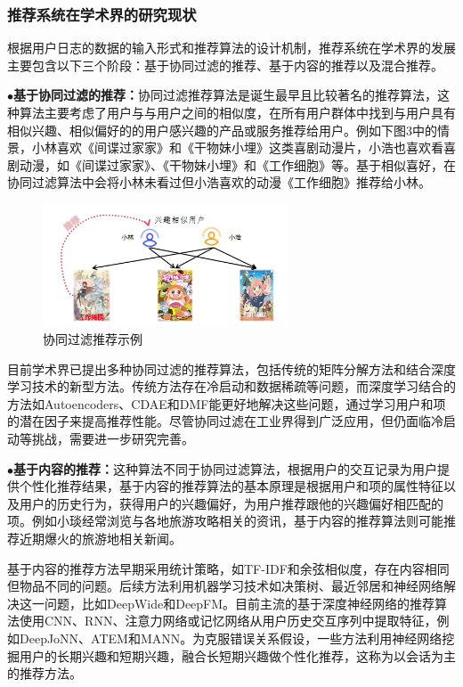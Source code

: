 \documentclass[withoutpreface,bwprint]{cumcmthesis} %
\begin{document}
	\subsubsection{ 推荐系统在学术界的研究现状}
	根据用户日志的数据的输入形式和推荐算法的设计机制，推荐系统在学术界的发展主要包含以下三个阶段：基于协同过滤的推荐、基于内容的推荐以及混合推荐。\par
	$\bullet$\textbf{基于协同过滤的推荐：}协同过滤推荐算法是诞生最早且比较著名的推荐算法，这种算法主要考虑了用户与与用户之间的相似度，在所有用户群体中找到与用户具有相似兴趣、相似偏好的的用户感兴趣的产品或服务推荐给用户。例如下图3中的情景，小林喜欢《间谍过家家》和《干物妹小埋》这类喜剧动漫片，小浩也喜欢看喜剧动漫，如《间谍过家家》、《干物妹小埋》和《工作细胞》等。基于相似喜好，在协同过滤算法中会将小林未看过但小浩喜欢的动漫《工作细胞》推荐给小林。\par
	\begin{figure}[H]
		\centering
		\includegraphics[width=0.65\textwidth]{3}
		\caption{协同过滤推荐示例}
		\label{fig:circuit-diagcam}
	\end{figure}
	目前学术界已提出多种协同过滤的推荐算法，包括传统的矩阵分解方法和结合深度学习技术的新型方法。传统方法存在冷启动和数据稀疏等问题，而深度学习结合的方法如Autoencoders、CDAE和DMF能更好地解决这些问题，通过学习用户和项的潜在因子来提高推荐性能。尽管协同过滤在工业界得到广泛应用，但仍面临冷启动等挑战，需要进一步研究完善。\par
	$\bullet$\textbf{基于内容的推荐：}这种算法不同于协同过滤算法，根据用户的交互记录为用户提供个性化推荐结果，基于内容的推荐算法的基本原理是根据用户和项的属性特征以及用户的历史行为，获得用户的兴趣偏好，为用户推荐跟他的兴趣偏好相匹配的项。例如小琰经常浏览与各地旅游攻略相关的资讯，基于内容的推荐算法则可能推荐近期爆火的旅游地相关新闻。\par
	基于内容的推荐方法早期采用统计策略，如TF-IDF和余弦相似度，存在内容相同但物品不同的问题。后续方法利用机器学习技术如决策树、最近邻居和神经网络解决这一问题，比如DeepWide和DeepFM。目前主流的基于深度神经网络的推荐算法使用CNN、RNN、注意力网络或记忆网络从用户历史交互序列中提取特征，例如DeepJoNN、ATEM和MANN。为克服错误关系假设，一些方法利用神经网络挖掘用户的长期兴趣和短期兴趣，融合长短期兴趣做个性化推荐，这称为以会话为主的推荐方法。\par
\end{document}

